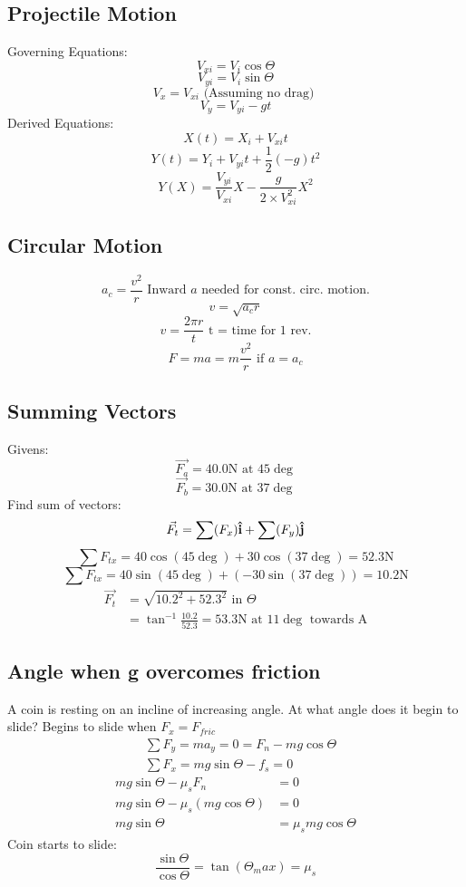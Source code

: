 \documentclass[8pt, twocolumn]{article}
\begin{document}
\subsection{Projectile Motion}
	Governing Equations:
	\[V_{xi} = V_i \cos{\Theta}\]
	\[V_{yi} = V_i \sin{\Theta}\]
	\[V_x = V_{xi} \text{ (Assuming no drag) }\]
	\[V_y = V_{yi} - gt\]
	\newline
	Derived Equations:
	\[X(t) = X_i + V_{xi} t\]
	\[Y(t) = Y_i + V_{yi} t + \frac{1}{2} (-g) t^2\]
	\[Y(X) = \frac{V_{yi}}{V_{xi}}X - \frac{g}{2 \times V_{xi}^2} X^2\]

\subsection{Circular Motion}
	\[a_c = \frac{v^2}{r} \text{ Inward } a \text{ needed for const. circ. motion.}\]
	\[v = \sqrt{a_c r}\]
	\[v = \frac{2 \pi r}{t} \text{ t = time for 1 rev.}\]
	\[F = ma = m \frac{v^2}{r} \text{ if } a = a_c\]

\subsection{Summing Vectors}
	Givens:
	\[\vec{F_a} = 40.0 \text{N at } 45\deg\]
	\[\vec{F_b} = 30.0 \text{N at } 37\deg\]
	\newline
	Find sum of vectors:
	\[\vec{F_t} = \sum(F_x) \mathbf{\hat{i}} + \sum(F_y) \mathbf{\hat{j}}\]
	\[\sum F_{tx} = 40 \cos (45 \deg) + 30 \cos (37 \deg) = 52.3 \text{N}\]
	\[\sum F_{tx} = 40 \sin (45 \deg) + (- 30 \sin (37 \deg)) = 10.2 \text{N}\]
	\[\begin{aligned}
	\vec{F_t} &= \sqrt{10.2^2 + 52.3^2} \text{ in } \Theta \\
	&= \tan^{-1}\frac{10.2}{52.3} = 53.3 \text{N at }11\deg \text{ towards A}\end{aligned}\]

\subsection{Angle when g overcomes friction}
	A coin is resting on an incline of increasing angle.  At what angle does it begin to slide?
	\newline
	Begins to slide when $F_x = F_{fric}$
	\[\begin{aligned}
	&\sum F_y = ma_y = 0 = F_n - mg\cos\Theta \\
	&\sum F_x = mg\sin\Theta - f_s = 0 \end{aligned}\]
	\[\begin{aligned}
	mg\sin\Theta - \mu_s F_n &= 0 \\
	mg\sin\Theta - \mu_s (mg\cos\Theta) &= 0 \\
	mg\sin\Theta &= \mu_s mg\cos\Theta \end{aligned}\]
	Coin starts to slide:
	\[\frac{\sin\Theta}{\cos\Theta} = \tan(\Theta_max) = \mu_s\]
\end{document}
